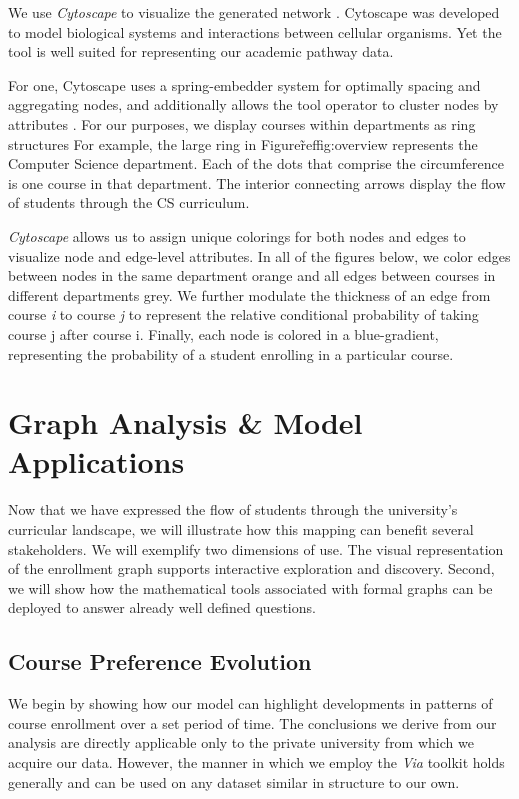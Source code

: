 \documentclass{sigchi}
\begin{document}
We use \textit{Cytoscape} to visualize the generated network
\cite{shannon2003cytoscape}. Cytoscape was developed to model
biological systems and interactions between cellular organisms. Yet
the tool is well suited for representing our academic pathway
data.

For one, Cytoscape uses a spring-embedder system for optimally spacing
and aggregating nodes, and additionally allows the tool operator to
cluster nodes by attributes \cite{Battista1994}. For our purposes, we
display courses within departments as ring structures For example, the
large ring in Figure\~ref{fig:overview} represents the Computer
Science department. Each of the dots that comprise the circumference
is one course in that department. The interior connecting arrows
display the flow of students through the CS curriculum.

{\em Cytoscape} allows us to assign unique colorings for both nodes
and edges to visualize node and edge-level attributes. In all of the
figures below, we color edges between nodes in the same department
orange and all edges between courses in different departments grey. We
further modulate the thickness of an edge from course \textit{i} to
course \textit{j} to represent the relative conditional probability of
taking course j after course i. Finally, each node is colored in a
blue-gradient, representing the probability of a student enrolling in
a particular course.

\section{Graph Analysis \& Model Applications}
\label{sec:analysis}
Now that we have expressed the flow of students through the
university's curricular landscape, we will illustrate how this mapping
can benefit several stakeholders. We will exemplify two dimensions of
use. The visual representation of the enrollment graph supports
interactive exploration and discovery. Second, we will show how the
mathematical tools associated with formal graphs can be deployed to
answer already well defined questions.

\subsection{Course Preference Evolution}
\label{sec:course_pref_evolution}

We begin by showing how our model can highlight developments in patterns of course enrollment over a set period of time. The conclusions we derive from our analysis are directly applicable only to the private university from which we acquire our data. However, the manner in which we employ the \textit{Via} toolkit holds generally and can be used on any dataset similar in structure to our own.
\end{document}
